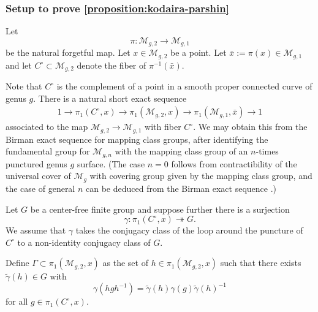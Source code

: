 \documentclass[12 pt]{amsart}
\theoremstyle{plain}
\theoremstyle{definition}
\theoremstyle{remark}
\numberwithin{equation}{section}
\begin{document}
\subsubsection{Setup to prove \autoref{proposition:kodaira-parshin}}
\label{subsubsection:setup}
Let $$\pi:\mathscr{M}_{g, 2}\to \mathscr{M}_{g,1}$$ be the natural forgetful map.
Let $x\in \mathscr{M}_{g,2}$ be a point. Let $\bar{x} := \pi(x) \in
\mathscr{M}_{g,1}$ and let $C^\circ\subset \mathscr{M}_{g,2}$
denote the fiber of $\pi^{-1}(\bar{x})$.

Note that $C^\circ$ is the complement of a point in a smooth proper connected curve of genus $g$. 
There is a natural short exact sequence
\begin{align}
1\to \pi_1(C^\circ, x) \to \pi_1(\mathscr M_{g,2}, x) \to \pi_1(\mathscr
M_{g,1}, \bar x)\to 1
\end{align}
associated to the map $\mathscr{M}_{g,2} \to \mathscr{M}_{g,1}$ with fiber
$C^{\circ}$.
We may obtain this from the Birman exact sequence \cite[Theorem
4.6]{farbM:a-primer} for mapping class groups,
after identifying the fundamental group for $\mathscr M_{g,n}$ with the mapping
class group of an $n$-times punctured genus $g$ surface.
(The case $n = 0$ follows from contractibility of the universal cover of
$\mathscr M_g$ \cite[Theorem 10.6]{farbM:a-primer} with covering group given by
the mapping class group,
and the case of general $n$ can be deduced from the Birman exact sequence
\cite[Theorem 4.6]{farbM:a-primer}.)

Let $G$ be a center-free finite group and suppose further there
is a surjection $$\gamma: \pi_1(C^\circ, x)\twoheadrightarrow G.$$
We assume that $\gamma$ takes the conjugacy class of the loop around the puncture of $C^\circ$ to a non-identity conjugacy class of $G$.

Define $\Gamma\subset \pi_1(\mathscr{M}_{g,2}, x)$ as the set of $h \in
\pi_1(\mathscr{M}_{g,2},x)$ such that there exists $\widetilde{\gamma}(h)\in G$ with $$\gamma(hgh^{-1})=\widetilde{\gamma}(h)\gamma(g)\widetilde{\gamma}(h)^{-1}$$ for all $g\in \pi_1(C^\circ, x).$ 
\end{document}
